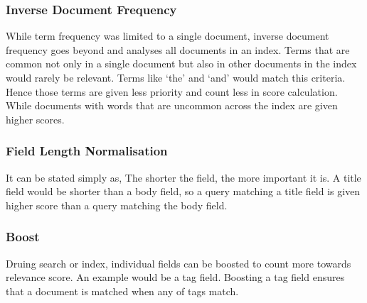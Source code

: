 \documentclass[12pt]{article}
\begin{document}
			\subsubsection{Inverse Document Frequency}
				While term frequency was limited to a single document, inverse document frequency goes beyond and analyses all documents in an index. Terms that are common not only in a single document but also in other documents in the index would rarely be relevant. Terms like `the' and `and' would match this criteria. Hence those terms are given less priority and count less in score calculation. While documents with words that are uncommon across the index are given higher scores.

			\subsubsection{Field Length Normalisation}
				It can be stated simply as, The shorter the field, the more important it is. A title field would be shorter than a body field, so a query matching a title field is given higher score than a query matching the body field. 

			\subsubsection{Boost}
				Druing search or index, individual fields can be boosted to count more towards relevance score. An example would be a tag field. Boosting a tag field ensures that a document is matched when any of tags match. 
	\newpage
	
	
\end{document}
